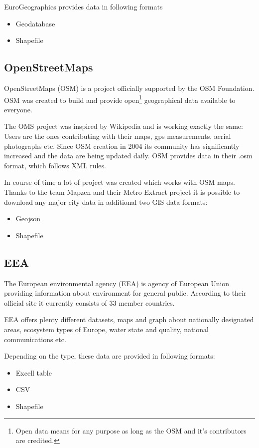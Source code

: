 \documentclass[thesis=M,english]{FITthesis}[2012/10/20]
\begin{document}
EuroGeographics provides data in following formats

\begin{itemize}
\item Geodatabase
\item Shapefile
\end{itemize}


\subsection{OpenStreetMaps}
OpenStreetMaps (OSM) is a project officially supported by the OSM Foundation.
OSM was created to build and provide open\footnote{Open data means for any purpose as long as the OSM and it's contributors are credited.} geographical data available to everyone.  

The OMS project was inspired by Wikipedia and is working exactly the same: Users are the ones contributing with their maps, gps measurements, aerial photographs etc. Since OSM creation in 2004 its community has significantly increased and the data are being updated daily.
OSM provides data in their .osm format, which follows XML rules.

In course of time a lot of project was created which works with OSM maps.
Thanks to the team Mapzen and their Metro Extract project it is possible to download any major city data in additional two GIS data formats:
\begin{itemize}
\item Geojson
\item Shapefile
\end{itemize}

\subsection{EEA}
The European environmental agency (EEA) is agency of European Union providing information about environment for general public. According to their official site \cite{EEA16} it currently consists of 33 member countries.

EEA offers plenty different datasets, maps and graph about nationally designated areas, ecosystem types of Europe, water state and quality, national communications etc. 

Depending on the type, these data are provided in following formats:
\begin{itemize}
\item Excell table
\item CSV
\item Shapefile
\end{itemize} 
\end{document}
